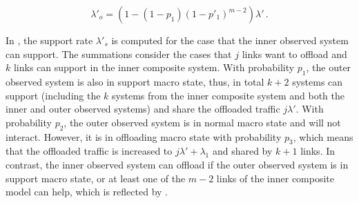\begin{equation}
\lambda'_{o} = (1-(1-p_1)(1-p'_1)^{m-2})\lambda'  \, .
\label{eq:offlaodinner}
\end{equation}

In , the support rate $\lambda'_s$ is computed for the case that the inner observed system can support. The summations consider the cases that $j$ links want to offload and $k$ links can support in the inner composite system. With probability $p_1$, the outer observed system is also in support macro state, thus, in total $k+2$ systems can support (including the $k$ systems from the inner composite system and both the inner and outer observed systems) and share the offloaded traffic $j\lambda'$. With probability $p_2$, the outer observed system is in normal macro state and will not interact. However, it is in offloading macro state with probability $p_3$, which means that the offloaded traffic is increased to $j\lambda'+\lambda_1$ and shared by $k+1$ links. In contrast, the inner observed system can offload if the outer observed system is in support macro state, or at least one of the $m-2$ links of the inner composite model can help, which is reflected by .

%
%
%

